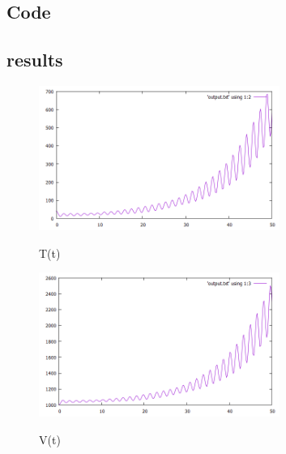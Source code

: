 \documentclass[12pt,a4paper]{article}	%
\begin{document}
\subsection{Code}

%

%

\newpage
\subsection{results}




\begin{figure}[h!]	
\centering
{\includegraphics[width=0.7\textwidth]{T100part.png}}		
\caption{T(t)}
\end{figure}

\begin{figure}[h!]	
\centering
{\includegraphics[width=0.7\textwidth]{V100part.png}}		
\caption{V(t)}
\end{figure}
\end{document}
